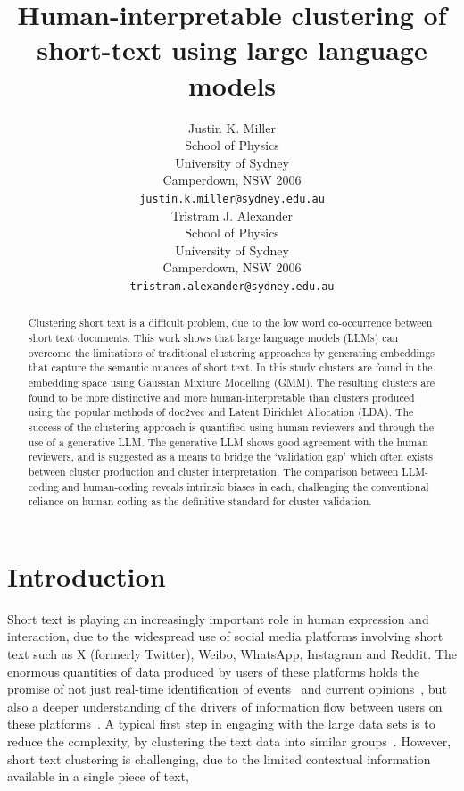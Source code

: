 \documentclass{article}
\title{Human-interpretable clustering of short-text using large language models}
\author{
 Justin K. Miller \\
  School of Physics\\
  University of Sydney\\
  Camperdown, NSW 2006 \\
  \texttt{justin.k.miller@sydney.edu.au} \\
   \And
 Tristram J. Alexander \\
  School of Physics\\
  University of Sydney\\
  Camperdown, NSW 2006 \\
  \texttt{tristram.alexander@sydney.edu.au} \\
}
\begin{document}
\maketitle

\begin{abstract} 
Clustering short text is a difficult problem, due to the low word co-occurrence between short text documents. This work shows that large language models (LLMs) can overcome the limitations of traditional clustering approaches by generating         \newline   embeddings that capture the semantic nuances of short text.  In this study clusters are found in the embedding space using Gaussian Mixture Modelling (GMM).  The resulting clusters are found to be more distinctive and more human-interpretable than clusters produced using the popular methods of doc2vec and Latent Dirichlet Allocation (LDA).  The success of the clustering approach is quantified using human reviewers and through the use of a generative LLM.  The generative LLM shows good agreement with the human reviewers, and is suggested as a means to bridge the `validation gap' which often exists between cluster production and cluster interpretation.  The comparison between LLM-coding and human-coding reveals intrinsic biases in each, challenging the conventional reliance on human coding as the definitive standard for cluster validation.

\end{abstract}


\section{Introduction}
Short text is playing an increasingly important role in human expression and interaction, due to the widespread use of social media platforms involving short text such as X (formerly Twitter), Weibo, WhatsApp, Instagram and Reddit.  The enormous quantities of data produced by users of these platforms holds the promise of not just real-time identification of events~\cite{atefeh2015} and current opinions~\cite{ravi2015}, but also a deeper understanding of the drivers of information flow between users on these platforms~\cite{pei2014}.  A typical first step in engaging with the large data sets is to reduce the complexity, by clustering the text data into similar groups~\cite{gudivada2018}.  However, short text clustering is challenging, due to the limited contextual information available in a single piece of text, 
\end{document}
